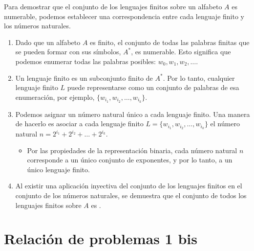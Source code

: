 \documentclass[12pt]{book} %
\begin{document}
\begin{solucion}

Para demostrar que el conjunto de los lenguajes finitos sobre un alfabeto \(A\) es numerable, podemos establecer una correspondencia entre cada lenguaje finito y los números naturales.

\begin{enumerate}
    \item {} Dado que un alfabeto \(A\) es finito, el conjunto de todas las palabras finitas que se pueden formar con sus símbolos, \(A^*\), es numerable. Esto significa que podemos enumerar todas las palabras posibles: \(w_0, w_1, w_2, \dots\).

    \item {} Un lenguaje finito es un subconjunto finito de \(A^*\). Por lo tanto, cualquier lenguaje finito \(L\) puede representarse como un conjunto de palabras de esa enumeración, por ejemplo, \(\{w_{i_1}, w_{i_2}, \dots, w_{i_k}\}\).

    \item {} Podemos asignar un número natural único a cada lenguaje finito. Una manera de hacerlo es asociar a cada lenguaje finito \(L = \{w_{i_1}, w_{i_2}, \dots, w_{i_k}\}\) el número natural \(n = 2^{i_1} + 2^{i_2} + \dots + 2^{i_k}\).
    \begin{itemize}
        \item Por las propiedades de la representación binaria, cada número natural \(n\) corresponde a un único conjunto de exponentes, y por lo tanto, a un único lenguaje finito.
    \end{itemize}

    \item {} Al existir una aplicación inyectiva del conjunto de los lenguajes finitos en el conjunto de los números naturales, se demuestra que el conjunto de todos los lenguajes finitos sobre \(A\) es .
\end{enumerate}

\end{solucion}

\newpage

\hypertarget{relaciuxf3n-de-problemas-1-bis}{%
\section{Relación de problemas 1
bis}\label{relaciuxf3n-de-problemas-1-bis}}
\end{document}
